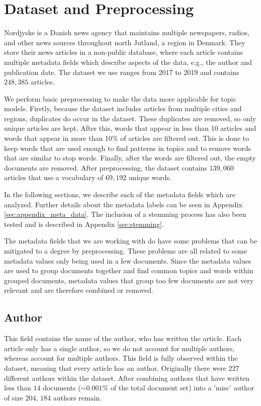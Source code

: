 \section{Dataset and Preprocessing}\label{sec:dataset}
Nordjyske is a Danish news agency that maintains multiple newspapers, radios, and other news sources throughout north Jutland, a region in Denmark.
They store their news articles in a non-public database, where each article contains multiple metadata fields which describe aspects of the data, e.g., the author and publication date.
The dataset we use ranges from 2017 to 2019 and contains $248,385$ articles.

We perform basic preprocessing to make the data more applicable for topic models.
Firstly, because the dataset includes articles from multiple cities and regions, duplicates do occur in the dataset.
These duplicates are removed, so only unique articles are kept.
After this, words that appear in less than 10 articles and words that appear in more than 10$\%$ of articles are filtered out.
This is done to keep words that are used enough to find patterns in topics and to remove words that are similar to stop words.
Finally, after the words are filtered out, the empty documents are removed.
After preprocessing, the dataset contains $139,060$ articles that use a vocabulary of $69,192$ unique words.

In the following sections, we describe each of the metadata fields which are analyzed.
Further details about the metadata labels can be seen in Appendix \autoref{sec:appendix_meta_data}.
The inclusion of a stemming process has also been tested and is described in Appendix \autoref{sec:stemming}.

The metadata fields that we are working with do have some problems that can be mitigated to a degree by preprocessing.
These problems are all related to some metadata values only being used in a few documents.
Since the metadata values are used to group documents together and find common topics and words within grouped documents, metadata values that group too few documents are not very relevant and are therefore combined or removed.

\subsection{Author}
This field contains the name of the author, who has written the article.
Each article only has a single author, so we do not account for multiple authors, whereas \citet{author_topic_2012} account for multiple authors.
This field is fully observed within the dataset, meaning that every article has an author.
Originally there were $227$ different authors within the dataset.
After combining authors that have written less than $14$ documents (${\sim}0.001\%$ of the total document set) into a 'misc' author of size $204$, $184$ authors remain.

